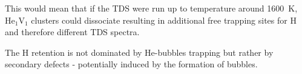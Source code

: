 
This would mean that if the TDS were run up to temperature around \SI{1600}{K}, $\mathrm{He}_1\mathrm{V}_1$ clusters could dissociate resulting in additional free trapping sites for H and therefore different TDS spectra.

The H retention is not dominated by He-bubbles trapping but rather by secondary defects - potentially induced by the formation of bubbles.



